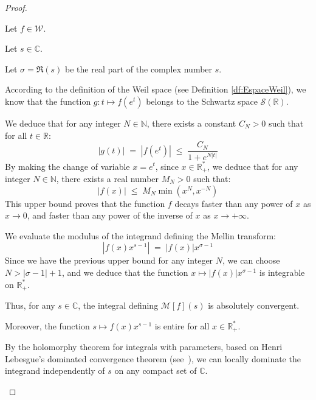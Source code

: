 \documentclass[Riemann_Hypothesis.tex]{subfiles}
\begin{document}
\begin{proof}
    \begin{part_proof}
        Let $f \in \mathcal{W}$. \par
        Let $s \in \mathbb{C}$. \par
        Let $\sigma = \Re(s)$ be the real part of the complex number $s$. \par
        According to the definition of the Weil space (see Definition \ref{df:EspaceWeil}), we know that the function $g : t \mapsto f(e^t)$ belongs to the Schwartz space $\mathcal{S}(\mathbb{R})$. \par
        We deduce that for any integer $N \in \mathbb{N}$, there exists a constant $C_N > 0$ such that for all $t \in \mathbb{R}$:
        \begin{equation*}
            |g(t)| \;=\; |f(e^t)| \;\leq\; \frac{C_N}{1 + e^{N|t|}}
        \end{equation*}
        By making the change of variable $x = e^t$, since $x \in \mathbb{R}_+^*$, we deduce that for any integer $N \in \mathbb{N}$, there exists a real number $M_N > 0$ such that:
        \begin{equation*}
            |f(x)| \;\leq\; M_N \min\left(x^N, x^{-N}\right)
        \end{equation*}
        This upper bound proves that the function $f$ decays faster than any power of $x$ as $x \to 0$, and faster than any power of the inverse of $x$ as $x \to +\infty$. \par
        We evaluate the modulus of the integrand defining the Mellin transform:
        \begin{equation*}
            \left| f(x) x^{s-1} \right| \;=\; |f(x)| x^{\sigma-1}
        \end{equation*}
        Since we have the previous upper bound for any integer $N$, we can choose 
        $N > |\sigma - 1| + 1$, and we deduce that the function 
        $x \mapsto |f(x)| x^{\sigma-1}$ is integrable on $\mathbb{R}_+^*$. \medskip\par

        Thus, for any $s \in \mathbb{C}$, the integral defining 
        $\mathcal{M}[f](s)$ is absolutely convergent. \par
        Moreover, the function $s \mapsto f(x) x^{s-1}$ is entire 
        for all $x \in \mathbb{R}_+^*$. \par
        By the holomorphy theorem for integrals with parameters, 
        based on Henri Lebesgue's dominated convergence theorem 
        (see~\cite{lebesgue1902_these_en}), we can locally dominate the integrand 
        independently of $s$ on any compact set of $\mathbb{C}$.
    \end{part_proof}



\end{proof}
\end{document}
